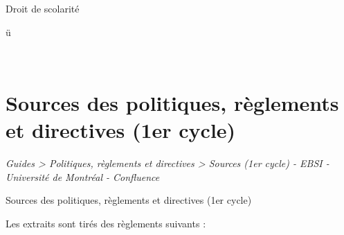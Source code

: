 \documentclass [12 pt]{article}
\begin{document}
                        
                            Droit de scolarité
                            
                                
                                    ü
                                
                            
                             
                        
                    
                
            
        
    
    
        \newpage
        \section {
        Sources des politiques, règlements et directives (1er cycle)
        }
        
        
        
        \textit{
        Guides > Politiques, règlements et directives > Sources (1er cycle) - EBSI -
            Université de Montréal - Confluence
        }
    
        Sources des politiques, règlements et directives (1er cycle)
        
            Les extraits sont tirés des règlements suivants :
            
\end{document}

